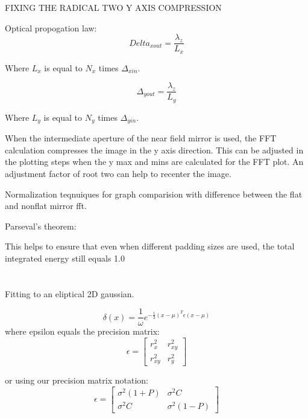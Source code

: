 \documentclass[twoside]{article}
\begin{document}
FIXING THE RADICAL TWO Y AXIS COMPRESSION

Optical propogation law:
\begin{equation}
    Delta_{x out} = \frac{\lambda_z}{L_x}
\end{equation}

Where $L_x$ is equal to $N_x$ times $\Delta_{x in}$.

\begin{equation}
    \Delta_{y out} = \frac{\lambda_z}{L_y}
\end{equation}

Where $L_y$ is equal to $N_y$ times $\Delta_{y in}$.

When the intermediate aperture of the near field mirror is used, the FFT calculation compresses the image in the y axis direction. This can be adjusted in the plotting steps when the y max and mins are calculated for the FFT plot. An adjustment factor of root two can help to recenter the image. 

Normalization teqnuiques for graph comparision with difference between the flat and nonflat mirror fft.

Parseval's theorem:



This helps to ensure that even when different padding sizes are used, the total integrated energy still equals 1.0

\section*{}
Fitting to an eliptical 2D gaussian. 

\begin{equation}
    \delta (x) = \frac{1}{\omega} e^{-\frac{1}{2}(x - \mu)^T \epsilon (x - \mu)}
\end{equation}
where epsilon equals the precision matrix:
\begin{equation}
    \epsilon = \begin{bmatrix}
        r_{x}^2 & r_{xy}^2 \\
        r_{xy}^2 & r_{y}^2
    \end{bmatrix}
\end{equation}

or using our precision matrix notation:
\begin{equation}
    \epsilon = \begin{bmatrix}
        \sigma^2(1+P) & \sigma^2 C \\
        \sigma^2 C & \sigma^2 (1-P)
    \end{bmatrix}
\end{equation}
\end{document}

